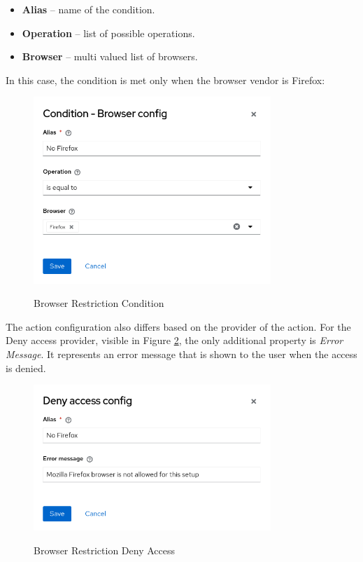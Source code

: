 \begin{itemize}
    \item \textbf{Alias} -- name of the condition.
    \item \textbf{Operation} -- list of possible operations.
    \item \textbf{Browser} -- multi valued list of browsers. 
\end{itemize}
\newline
\newline
In this case, the condition is met only when the browser vendor is Firefox:

\begin{figure}[htbp]
  \centering
  \includegraphics[width=0.8\textwidth]{img/sections/5-design/policy-browser-condition.png}
  \label{fig:design-policy-browser-flow-condition}
  \caption{Browser Restriction Condition}
\end{figure}

The action configuration also differs based on the provider of the action.
For the Deny access provider, visible in Figure \ref{fig:design-policy-browser-flow-deny}, the only additional property is \textit{Error Message}.
It represents an error message that is shown to the user when the access is denied.

\newpage

\begin{figure}[htbp]
  \centering
  \includegraphics[width=0.8\textwidth]{img/sections/5-design/policy-browser-deny.png}
  \label{fig:design-policy-browser-flow-deny}
  \caption{Browser Restriction Deny Access}
\end{figure}

